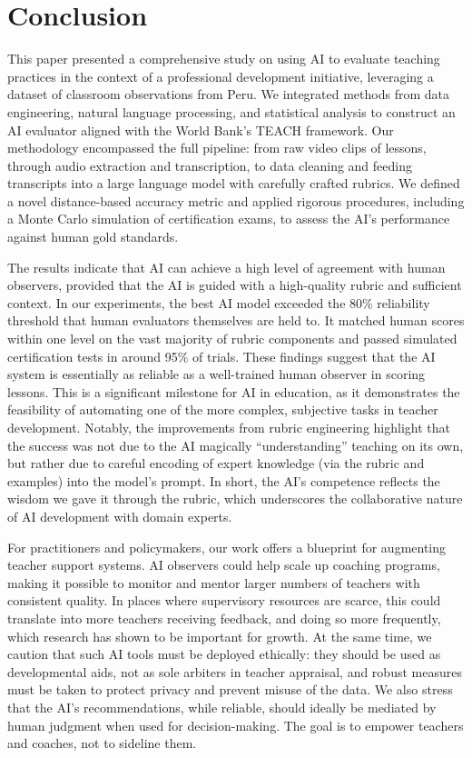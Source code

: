 \documentclass[12pt]{article}
\begin{document}
\section{Conclusion}
\label{sec:conclusion}
\noindent This paper presented a comprehensive study on using AI to evaluate teaching practices in the context of a professional development initiative, leveraging a dataset of classroom observations from Peru. We integrated methods from data engineering, natural language processing, and statistical analysis to construct an AI evaluator aligned with the World Bank’s TEACH framework. Our methodology encompassed the full pipeline: from raw video clips of lessons, through audio extraction and transcription, to data cleaning and feeding transcripts into a large language model with carefully crafted rubrics. We defined a novel distance-based accuracy metric and applied rigorous procedures, including a Monte Carlo simulation of certification exams, to assess the AI’s performance against human gold standards.

The results indicate that AI can achieve a high level of agreement with human observers, provided that the AI is guided with a high-quality rubric and sufficient context. In our experiments, the best AI model exceeded the 80\% reliability threshold that human evaluators themselves are held to. It matched human scores within one level on the vast majority of rubric components and passed simulated certification tests in around 95\% of trials. These findings suggest that the AI system is essentially as reliable as a well-trained human observer in scoring lessons. This is a significant milestone for AI in education, as it demonstrates the feasibility of automating one of the more complex, subjective tasks in teacher development. Notably, the improvements from rubric engineering highlight that the success was not due to the AI magically “understanding” teaching on its own, but rather due to careful encoding of expert knowledge (via the rubric and examples) into the model’s prompt. In short, the AI’s competence reflects the wisdom we gave it through the rubric, which underscores the collaborative nature of AI development with domain experts.

For practitioners and policymakers, our work offers a blueprint for augmenting teacher support systems. AI observers could help scale up coaching programs, making it possible to monitor and mentor larger numbers of teachers with consistent quality. In places where supervisory resources are scarce, this could translate into more teachers receiving feedback, and doing so more frequently, which research has shown to be important for growth. At the same time, we caution that such AI tools must be deployed ethically: they should be used as developmental aids, not as sole arbiters in teacher appraisal, and robust measures must be taken to protect privacy and prevent misuse of the data. We also stress that the AI’s recommendations, while reliable, should ideally be mediated by human judgment when used for decision-making. The goal is to empower teachers and coaches, not to sideline them.
\end{document}
